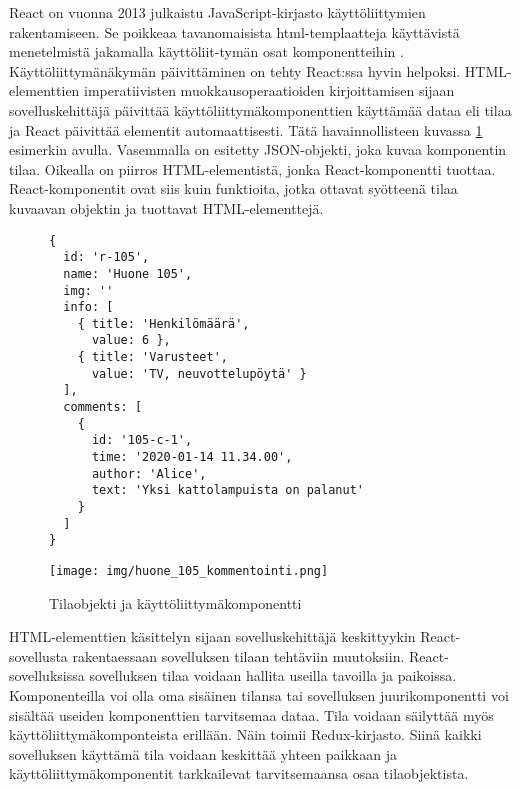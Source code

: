 \documentclass[finnish,twoside,censored,csm,sw-track-2018]{HYthesisML}
\begin{document}

React on vuonna 2013 julkaistu \citep{react-release} JavaScript-kirjasto käyttöliittymien rakentamiseen. Se poikkeaa tavanomaisista html-templaatteja käyttävistä menetelmistä jakamalla käyttöliit-tymän osat komponentteihin \citep{react-why}. Käyttöliittymänäkymän päivittäminen on tehty React:ssa hyvin helpoksi. HTML-elementtien imperatiivisten muokkausoperaatioiden kirjoittamisen sijaan sovelluskehittäjä päivittää käyttöliittymäkomponenttien käyttämää dataa eli tilaa ja React päivittää elementit automaattisesti. Tätä havainnollisteen kuvassa \ref{fig-react-tila-ja-komponentti} esimerkin avulla. Vasemmalla on esitetty JSON-objekti, joka kuvaa komponentin tilaa. Oikealla on piirros HTML-elementistä, jonka React-komponentti tuottaa. React-komponentit ovat siis kuin funktioita, jotka ottavat syötteenä tilaa kuvaavan objektin ja tuottavat HTML-elementtejä.

\begin{figure}[ht]
\begin{minipage}{.5\textwidth}
  \begin{Verbatim}[fontsize=\scriptsize]
{
  id: 'r-105',
  name: 'Huone 105',
  img: ''
  info: [
    { title: 'Henkilömäärä', 
      value: 6 },
    { title: 'Varusteet', 
      value: 'TV, neuvottelupöytä' }
  ],
  comments: [
    {
      id: '105-c-1',
      time: '2020-01-14 11.34.00',
      author: 'Alice',
      text: 'Yksi kattolampuista on palanut'
    }
  ]
}
\end{Verbatim}
\end{minipage}%
\begin{minipage}{.5\textwidth}
  \begin{center}
    \texttt{[image: img/huone\_105\_kommentointi.png]}
  \end{center}
\end{minipage}%
\caption{Tilaobjekti ja käyttöliittymäkomponentti}
\label{fig-react-tila-ja-komponentti}
\end{figure}

HTML-elementtien käsittelyn sijaan sovelluskehittäjä keskittyykin React-sovellusta rakentaessaan sovelluksen tilaan tehtäviin muutoksiin. React-sovelluksissa sovelluksen tilaa voidaan hallita useilla tavoilla ja paikoissa. Komponenteilla voi olla oma sisäinen tilansa tai sovelluksen juurikomponentti voi sisältää useiden komponenttien tarvitsemaa dataa. Tila voidaan säilyttää myös käyttöliittymäkomponteista erillään. Näin toimii Redux-kirjasto. Siinä kaikki sovelluksen käyttämä tila voidaan keskittää yhteen paikkaan ja käyttöliittymäkomponentit tarkkailevat tarvitsemaansa osaa tilaobjektista. 
\end{document}

